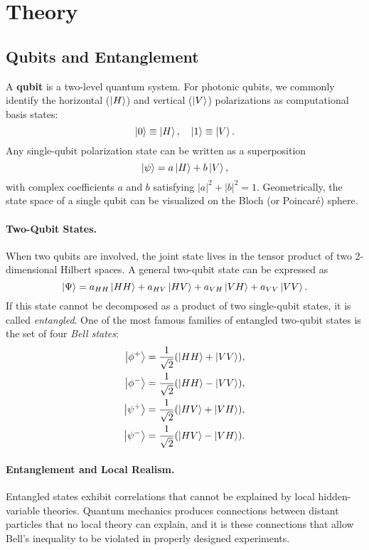 \section{Theory}

\subsection{Qubits and Entanglement}
A \textbf{qubit} is a two-level quantum system. For photonic qubits, we commonly identify the horizontal ($\ket{H}$) and vertical ($\ket{V}$) polarizations as computational basis states:
\[
\ket{0} \equiv \ket{H}, 
\quad
\ket{1} \equiv \ket{V}.
\]
Any single-qubit polarization state can be written as a superposition
\[
\ket{\psi} = a \ket{H} + b \ket{V},
\]
with complex coefficients $a$ and $b$ satisfying $|a|^2 + |b|^2 = 1$. Geometrically, the state space of a single qubit can be visualized on the Bloch (or Poincaré) sphere.

\paragraph{Two-Qubit States.}
When two qubits are involved, the joint state lives in the tensor product of two 2-dimensional Hilbert spaces. A general two-qubit state can be expressed as
\[
\ket{\Psi} = 
  a_{HH}\ket{HH} + a_{HV}\ket{HV} + a_{VH}\ket{VH} + a_{VV}\ket{VV}.
\]
If this state cannot be decomposed as a product of two single-qubit states, it is called \emph{entangled}. One of the most famous families of entangled two-qubit states is the set of four \emph{Bell states}:
\begin{align*}
\ket{\phi^+} &= \frac{1}{\sqrt{2}}(\ket{HH} + \ket{VV}), \\
\ket{\phi^-} &= \frac{1}{\sqrt{2}}(\ket{HH} - \ket{VV}), \\
\ket{\psi^+} &= \frac{1}{\sqrt{2}}(\ket{HV} + \ket{VH}), \\
\ket{\psi^-} &= \frac{1}{\sqrt{2}}(\ket{HV} - \ket{VH}).
\end{align*}

\paragraph{Entanglement and Local Realism.}
Entangled states exhibit correlations that cannot be explained by local hidden-variable theories. Quantum mechanics produces connections between distant particles that no local theory can explain, and it is these connections that allow Bell’s inequality to be violated in properly designed experiments.

